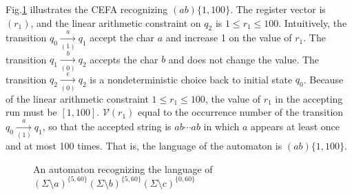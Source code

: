 \begin{example} \label{eg:1}
  Fig.\ref{fig:repetition} illustrates the CEFA recognizing $(ab)\{1,100\}$. The register vector is $(r_1)$, and the linear arithmetic constraint on $q_2$ is $1\leq r_1\leq 100$. Intuitively, the transition $q_0 \xrightarrow[(1)]{a} q_1$ accept the char $a$ and increase 1 on the value of $r_1$. The transition $q_1 \xrightarrow[(0)]{b} q_2$ accepts the char $b$ and does not change the value. The transition $q_2 \xrightarrow[(0)]{\epsilon} q_2$ is a nondeterministic choice back to initial state $q_0$. Because of the linear arithmetic constraint $1\leq r_1\leq 100$, the value of $r_1$ in the accepting run must be $[1,100]$. $\mathcal{V}(r_1)$ equal to the occurrence number of the transition $q_0 \xrightarrow[(1)]{a} q_1$, so that the accepted string is $ab\cdots ab$ in which $a$ appears at least once and at most 100 times. That is, the language of the automaton is $(ab)\{1,100\}$.
  \begin{figure}[h]
    \centering
    
    \caption{An automaton recognizing the language of $(\Sigma \setminus a)^{\{5, 60\}} (\Sigma \setminus b)^{\{5, 60\}} (\Sigma \setminus c)^{\{0, 60\}}$}
    \label{fig:repetition}
  \end{figure}
\end{example}


